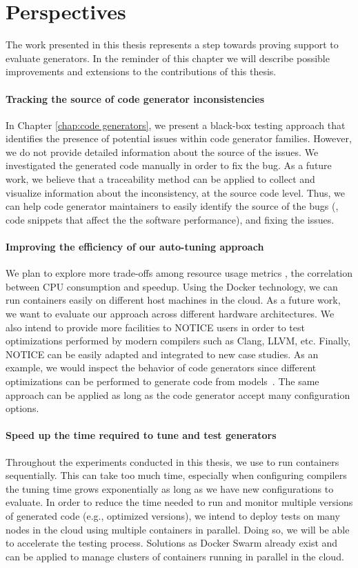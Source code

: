 \section{Perspectives}
The work presented in this thesis represents a step towards proving support to evaluate generators. In the reminder of this chapter we will describe possible improvements and extensions to the contributions of this thesis.

\paragraph{Tracking the source of code generator inconsistencies} 
In Chapter \ref{chap:code generators}, we present a black-box testing approach that identifies the presence of potential issues within code generator families. However, we do not provide detailed information about the source of the issues. We investigated the generated code manually in order to fix the bug. As a future work, we believe that a traceability method can be applied to collect and visualize information about the inconsistency, at the source code level. Thus, we can help code generator maintainers to easily identify the source of the bugs (\eg, code snippets that affect the the software performance), and fixing the issues.

\paragraph{Improving the efficiency of our auto-tuning approach}
We plan to explore more trade-offs among resource usage metrics \eg, the correlation between CPU consumption and speedup. Using the Docker technology, we can run containers easily on different host machines in the cloud. As a future work, we want to evaluate our approach across different hardware architectures.
We also intend to provide more facilities to NOTICE users in order to test optimizations performed by modern compilers such as Clang, LLVM, etc.
Finally, NOTICE can be easily adapted and integrated to new case studies. As an example, we would inspect the behavior of code generators since different optimizations can be performed to generate code from models~\cite{stuermer2007systematic}. The same approach can be applied as long as the code generator accept many configuration options.

\paragraph{Speed up the time required to tune and test generators}
Throughout the experiments conducted in this thesis, we use to run containers sequentially. This can take too much time, especially when configuring compilers the tuning time grows exponentially as long as we have new configurations to evaluate. 
In order to reduce the time needed to run and monitor multiple versions of generated code (e.g., optimized versions), we intend to deploy tests on many nodes in the cloud using multiple containers in parallel. Doing so, we will be able to accelerate the testing process. Solutions as Docker Swarm already exist and can be applied to manage clusters of containers running in parallel in the cloud.


